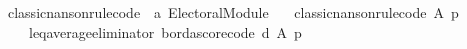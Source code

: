 \begin{isabellebody}
\isanewline
{}\isamarkupfalse%
\ classic{\isacharunderscore}{\kern0pt}nanson{\isacharunderscore}{\kern0pt}rule{\isacharunderscore}{\kern0pt}code\ {\isacharcolon}{\kern0pt}{\isacharcolon}{\kern0pt}\ {\isachardoublequoteopen}{\isacharprime}{\kern0pt}a\ Electoral{\isacharunderscore}{\kern0pt}Module{\isachardoublequoteclose}\ \isanewline
\ \ {\isachardoublequoteopen}classic{\isacharunderscore}{\kern0pt}nanson{\isacharunderscore}{\kern0pt}rule{\isacharunderscore}{\kern0pt}code\ A\ p\ {\isacharequal}{\kern0pt}\isanewline
\ \ \ \ {\isacharparenleft}{\kern0pt}{\isacharparenleft}{\kern0pt}leq{\isacharunderscore}{\kern0pt}average{\isacharunderscore}{\kern0pt}eliminator\ borda{\isacharunderscore}{\kern0pt}score{\isacharunderscore}{\kern0pt}code{\isacharparenright}{\kern0pt}\ {\isasymcirclearrowleft}\isactrlsub {\isasymexists}\isactrlsub {\isacharbang}{\kern0pt}\isactrlsub d{\isacharparenright}{\kern0pt}\ A\ p{\isachardoublequoteclose}\isanewline
%
\isadelimtheory
\isanewline
%
\endisadelimtheory
%
\isatagtheory
{}\isamarkupfalse%
%
\endisatagtheory
{\isafoldtheory}%
%
\isadelimtheory
%
\endisadelimtheory
%
\end{isabellebody}%
\endinput
